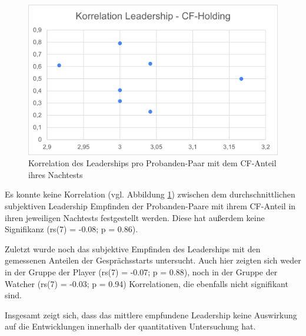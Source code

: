 \begin{figure}[ht]
\centering
\includegraphics[width=1\linewidth]{content/pictures/korrelation_leadership_cfh.png}
\caption{Korrelation des Leaderships pro Probanden-Paar mit dem \ac{CF}-Anteil ihres Nachtests}
\label{fig:correlation_leadership_cfh}
\end{figure}

Es konnte keine Korrelation (vgl. Abbildung \ref{fig:correlation_leadership_cfh}) zwischen dem durchschnittlichen subjektiven Leadership Empfinden der Probanden-Paare mit ihrem \ac{CF}-Anteil in ihren jeweiligen Nachtests festgestellt werden. Diese hat außerdem keine Signifikanz (rs(7) = -0.08; p = 0.86).

Zuletzt wurde noch das subjektive Empfinden des Leaderships mit den gemessenen Anteilen der Gesprächsstarts untersucht. Auch hier zeigten sich weder in der Gruppe der Player (rs(7) = -0.07; p = 0.88), noch in der Gruppe der Watcher (rs(7) = -0.03; p = 0.94) Korrelationen, die ebenfalls nicht signifikant sind. 

Insgesamt zeigt sich, dass das mittlere empfundene Leadership keine Auswirkung auf die Entwicklungen innerhalb der quantitativen Untersuchung hat.



